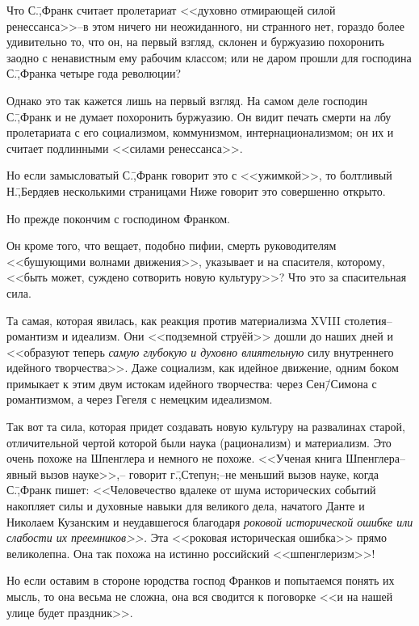 Что С.\=,Франк считает пролетариат <<духовно отмирающей силой ренессанса>>\---в этом ничего ни неожиданного, ни странного нет, гораздо более удивительно то, что он, на первый взгляд, склонен и буржуазию похоронить заодно с ненавистным ему рабочим классом; или не даром прошли для господина С.\=,Франка четыре года революции?

Однако это так кажется лишь на первый взгляд. На самом деле господин С.\=,Франк и не думает похоронить буржуазию. Он видит печать смерти на лбу пролетариата с его социализмом, коммунизмом, интернационализмом; он их и считает подлинными <<силами ренессанса>>.

Но если замысловатый С.\=,Франк говорит это с <<ужимкой>>, то болтливый Н.\=,Бердяев несколькими страницами Ниже говорит это совершенно открыто.

Но прежде покончим с господином Франком.

Он кроме того, что вещает, подобно пифии, смерть руководителям <<бушующими волнами движения>>, указывает и на спасителя, которому, <<быть может, суждено сотворить новую культуру>>? Что это за спасительная сила.

Та самая, которая явилась, как реакция против материализма XVIII столетия\---романтизм и идеализм. Они <<подземной струёй>> дошли до наших дней и <<образуют теперь \emph{самую глубокую и духовно влиятельную} силу внутреннего идейного творчества>>. Даже социализм, как идейное движение, одним боком примыкает к этим двум истокам идейного творчества: через Сен\=/Симона с романтизмом, а через Гегеля с немецким идеализмом.

Так вот та сила, которая придет создавать новую культуру на развалинах старой, отличительной чертой которой были наука (рационализм) и материализм. Это очень похоже на Шпенглера и немного не похоже. <<Ученая книга Шпенглера\---явный вызов науке>>,\--- говорит г.\=,Степун;\---не меньший вызов науке, когда С.\=,Франк пишет: <<Человечество вдалеке от шума исторических событий накопляет силы и духовные навыки для великого дела, начатого Данте и Николаем Кузанским и неудавшегося благодаря \emph{роковой исторической ошибке или слабости их преемников>>.} Эта <<роковая историческая ошибка>> прямо великолепна. Она так похожа на истинно российский <<шпенглеризм>>!

Но если оставим в стороне юродства господ Франков и попытаемся понять их мысль, то она весьма не сложна, она вся сводится к поговорке <<и на нашей улице будет праздник>>.

